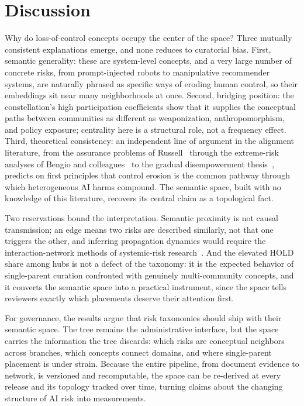 \documentclass[11pt,a4paper]{article}
\begin{document}
\section*{Discussion}

Why do loss-of-control concepts occupy the center of the space? Three mutually consistent explanations emerge, and none reduces to curatorial bias. First, semantic generality: these are system-level concepts, and a very large number of concrete risks, from prompt-injected robots to manipulative recommender systems, are naturally phrased as specific ways of eroding human control, so their embeddings sit near many neighborhoods at once. Second, bridging position: the constellation's high participation coefficients show that it supplies the conceptual paths between communities as different as weaponization, anthropomorphism, and policy exposure; centrality here is a structural role, not a frequency effect. Third, theoretical consistency: an independent line of argument in the alignment literature, from the assurance problems of Russell~\cite{russell2019} through the extreme-risk analyses of Bengio and colleagues~\cite{bengio2024} to the gradual disempowerment thesis~\cite{kulveit2025}, predicts on first principles that control erosion is the common pathway through which heterogeneous AI harms compound. The semantic space, built with no knowledge of this literature, recovers its central claim as a topological fact.

Two reservations bound the interpretation. Semantic proximity is not causal transmission; an edge means two risks are described similarly, not that one triggers the other, and inferring propagation dynamics would require the interaction-network methods of systemic-risk research~\cite{helbing2013}. And the elevated HOLD share among hubs is not a defect of the taxonomy: it is the expected behavior of single-parent curation confronted with genuinely multi-community concepts, and it converts the semantic space into a practical instrument, since the space tells reviewers exactly which placements deserve their attention first.

For governance, the results argue that risk taxonomies should ship with their semantic space. The tree remains the administrative interface, but the space carries the information the tree discards: which risks are conceptual neighbors across branches, which concepts connect domains, and where single-parent placement is under strain. Because the entire pipeline, from document evidence to network, is versioned and recomputable, the space can be re-derived at every release and its topology tracked over time, turning claims about the changing structure of AI risk into measurements.
\end{document}
